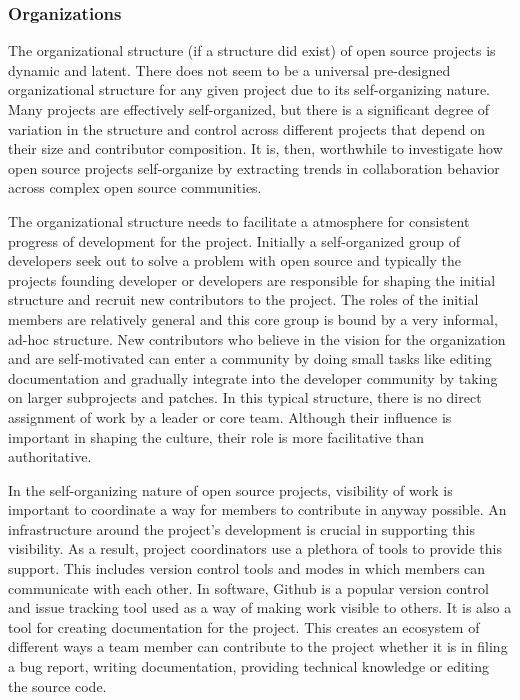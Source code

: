 \subsubsection{Organizations}

The organizational structure (if a structure did exist) of open source projects is dynamic and latent. There does not seem to be a universal pre-designed organizational structure for any given project due to its self-organizing nature. Many projects are effectively self-organized, but there is a significant degree of variation in the structure and control across different projects that depend on their size and contributor composition. It is, then, worthwhile to investigate how open source projects self-organize by extracting trends in collaboration behavior across complex open source communities.

The organizational structure needs to facilitate a atmosphere for consistent progress of development for the project. Initially a self-organized group of developers seek out to solve a problem with open source and typically the projects founding developer or developers are responsible for shaping the initial structure and recruit new contributors to the project. The roles of the initial members are relatively general and this core group is bound by a very informal, ad-hoc structure. New contributors who believe in the vision for the organization and are self-motivated can enter a community by doing small tasks like editing documentation and gradually integrate into the developer community by taking on larger subprojects and patches. In this typical structure, there is no direct assignment of work by a leader or core team. Although their influence is important in shaping the culture, their role is more facilitative than authoritative.

In the self-organizing nature of open source projects, visibility of work is important to coordinate a way for members to contribute in anyway possible. An infrastructure around the project's development is crucial in supporting this visibility. As a result, project coordinators use a plethora of tools to provide this support. This includes version control tools and modes in which members can communicate with each other. In software, Github is a popular version control and issue tracking tool used as a way of making work visible to others. It is also a tool for creating documentation for the project. This creates an ecosystem of different ways a team member can contribute to the project whether it is in filing a bug report, writing documentation, providing technical knowledge or editing the source code.
